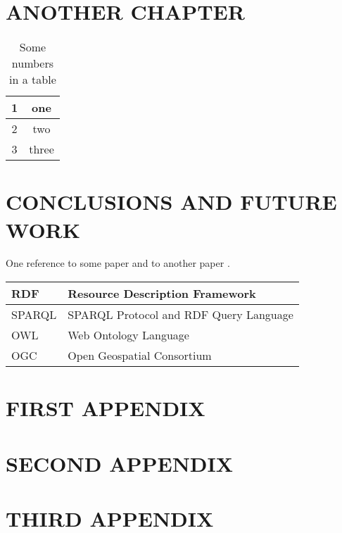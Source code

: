 \documentclass[inscr,ack,preface]{dithesis}
\begin{document}
\chapter{ANOTHER CHAPTER}
  \lipsum[10-20]

  \begin{table}
    \centering

    \caption{Some numbers in a table}
    \label{numbers}

    \begin{tabular}{| c | c |}
      \hline
      1 & one \\
      \hline
      2 & two \\
      \hline
      3 & three \\
      \hline
    \end{tabular}

  \end{table}

\chapter{CONCLUSIONS AND FUTURE WORK}
  \lipsum[3-5]
  One reference to some paper \cite{manning:corenlp} and to another paper
  \cite{pennington:glove}.

\backmatter

\abbreviations
\begin{center}
	\renewcommand{\arraystretch}{1.5}
	\begin{longtable}{| l | @{\qquad} l |}
	\hline
	RDF    & Resource Description Framework \\
  \hline
	SPARQL & SPARQL Protocol and RDF Query Language \\
  \hline
	OWL    & Web Ontology Language \\
  \hline
	OGC    & Open Geospatial Consortium \\
	\hline
	\end{longtable}
\end{center}

\begin{appendix}
\appendixstartedtrue

{}

\chapter{FIRST APPENDIX}
\chapter{SECOND APPENDIX}
\chapter{THIRD APPENDIX}
\end{appendix}


{\footnotesize }

\end{document}
